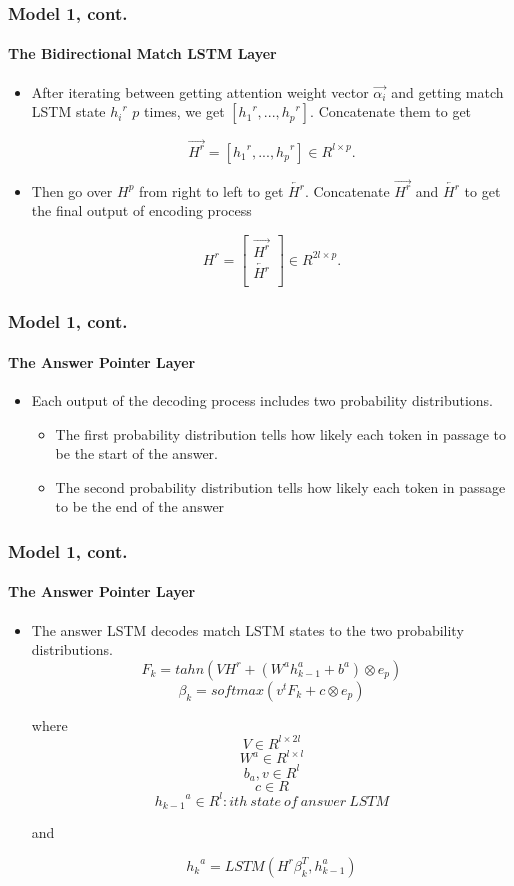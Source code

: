 \documentclass{beamer}
\begin{document}
\begin{frame} \frametitle{Model 1, cont.}\framesubtitle{The Bidirectional Match LSTM Layer}
    \begin{itemize}
        \item After iterating between getting attention weight vector $\overrightarrow{\alpha _i}$ and getting match LSTM state ${{h_{i}}^r}$ $p$ times, we get $[{{h_{1}}^r}, ..., {{h_{p}}^r}]$. Concatenate them to get

        $$\overrightarrow{H^r} = [{{h_{1}}^r}, ..., {{h_{p}}^r}] \in R^{l \times p}.$$

        \item Then go over $H^p$ from right to left to get $\overleftarrow{H^r}$. Concatenate $\overrightarrow{H^r}$ and $\overleftarrow{H^r}$ to get the final output of encoding process

        \[ H^r =
        \begin{bmatrix}
        \overrightarrow{H^r} \\
        \overleftarrow{H^r} \\
        \end{bmatrix}
        \in R^{2l \times p}.
        \]
    \end{itemize}

\end{frame}

\begin{frame} \frametitle{Model 1, cont.}\framesubtitle{The Answer Pointer Layer}
    \begin{itemize}
        \item Each output of the decoding process includes two probability distributions.
           \begin{itemize}
               \item The first probability distribution tells how likely each token in passage to be the start of the answer.
               \item The second probability distribution tells how likely each token in passage to be the end of the answer
           \end{itemize}
    \end{itemize}

\end{frame}

\begin{frame}\frametitle{Model 1, cont.}\framesubtitle{The Answer Pointer Layer}
    \begin{itemize}
        \item The answer LSTM decodes match LSTM states to the two probability distributions.
        $$F_k = tahn(VH^r + (W^a{h^a_{k-1}} +  b^a) \otimes e_p)$$
        $$\beta _k = softmax(v^tF_k + c \otimes e_p)$$


        where
        $$V \in R^{l \times 2l}$$
        $$W^a\in R^{l \times l} $$
        $$b_a, v\in R^{l}  $$
        $$c \in R $$
        $${h_{k-1}}^a\in R^{l}: ith\ state\ of\ answer\ LSTM  $$

        and


        $${h_k}^a = LSTM(H^r\beta _k^T, h_{k-1}^a)$$
    \end{itemize}
\end{frame}
\end{document}

